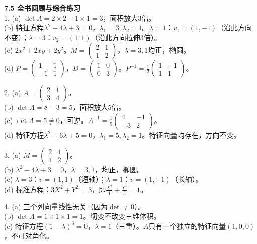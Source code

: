 \noindent\textbf{7.5 全书回顾与综合练习}\\
1. (a) $\det A = 2\times2-1\times1=3$，面积放大$3$倍。\\
(b) 特征方程$\lambda^2-4\lambda+3=0$，$\lambda_1=3,\lambda_2=1$。$\lambda=1$：$v_1=(1,-1)$（沿此方向不变）；$\lambda=3$：$v_2=(1,1)$（沿此方向拉伸$3$倍）。\\
(c) $2x^2+2xy+2y^2$。$M=\begin{pmatrix}2&1\\1&2\end{pmatrix}$，$\lambda=3,1$均正，椭圆。\\
(d) $P=\begin{pmatrix}1&1\\-1&1\end{pmatrix}$，$D=\begin{pmatrix}1&0\\0&3\end{pmatrix}$。$P^{-1}=\frac12\begin{pmatrix}1&-1\\1&1\end{pmatrix}$。

2. (a) $A=\begin{pmatrix}2&1\\3&4\end{pmatrix}$。\\
(b) $\det A = 8-3=5$，面积放大$5$倍。\\
(c) $\det A=5\neq0$，可逆。$A^{-1}=\frac15\begin{pmatrix}4&-1\\-3&2\end{pmatrix}$。\\
(d) 特征方程$\lambda^2-6\lambda+5=0$，$\lambda_1=5,\lambda_2=1$。特征向量均存在，方向不变。

3. (a) $M=\begin{pmatrix}2&1\\1&2\end{pmatrix}$。\\
(b) $\lambda^2-4\lambda+3=0$，$\lambda=3,1$，均正，椭圆。\\
(c) $\lambda=3$：$v=(1,1)$（短轴）；$\lambda=1$：$v=(1,-1)$（长轴）。\\
(d) 标准方程：$3X^2+Y^2=3$，即$\frac{X^2}{1}+\frac{Y^2}{3}=1$。

4. (a) 三个列向量线性无关（因为$\det\neq0$）。\\
(b) $\det A = 1\times1\times1=1$。切变不改变三维体积。\\
(c) 特征方程$(1-\lambda)^3=0$，$\lambda=1$（三重）。$A$只有一个独立的特征向量$(1,0,0)$，不可对角化。

